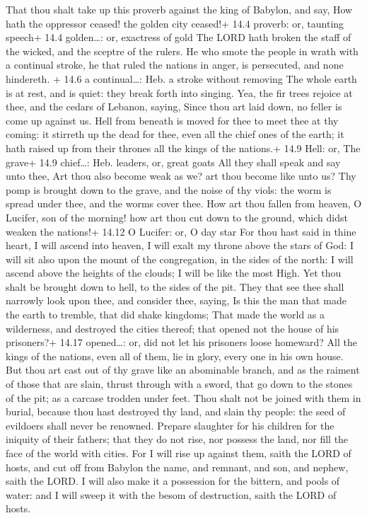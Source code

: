  That thou shalt take up this proverb against the king of
Babylon, and say, How hath the oppressor ceased! the golden city
ceased!+ 14.4 proverb: or, taunting speech+ 14.4 golden\ldots: or,
exactress of gold  The LORD hath broken the staff of the
wicked, and the sceptre of the rulers.  He who smote the
people in wrath with a continual stroke, he that ruled the nations in
anger, is persecuted, and none hindereth. + 14.6 a continual\ldots: Heb.
a stroke without removing  The whole earth is at rest, and
is quiet: they break forth into singing.  Yea, the fir trees
rejoice at thee, and the cedars of Lebanon, saying, Since thou art laid
down, no feller is come up against us.  Hell from beneath is
moved for thee to meet thee at thy coming: it stirreth up the dead for
thee, even all the chief ones of the earth; it hath raised up from their
thrones all the kings of the nations.+ 14.9 Hell: or, The grave+ 14.9
chief\ldots: Heb. leaders, or, great goats  All they shall
speak and say unto thee, Art thou also become weak as we? art thou
become like unto us?  Thy pomp is brought down to the
grave, and the noise of thy viols: the worm is spread under thee, and
the worms cover thee.  How art thou fallen from heaven, O
Lucifer, son of the morning! how art thou cut down to the ground, which
didst weaken the nations!+ 14.12 O Lucifer: or, O day star 
For thou hast said in thine heart, I will ascend into heaven, I will
exalt my throne above the stars of God: I will sit also upon the mount
of the congregation, in the sides of the north:  I will
ascend above the heights of the clouds; I will be like the most High.
 Yet thou shalt be brought down to hell, to the sides of
the pit.  They that see thee shall narrowly look upon thee,
and consider thee, saying, Is this the man that made the earth to
tremble, that did shake kingdoms;  That made the world as a
wilderness, and destroyed the cities thereof; that opened not the house
of his prisoners?+ 14.17 opened\ldots: or, did not let his prisoners
loose homeward?  All the kings of the nations, even all of
them, lie in glory, every one in his own house.  But thou
art cast out of thy grave like an abominable branch, and as the raiment
of those that are slain, thrust through with a sword, that go down to
the stones of the pit; as a carcase trodden under feet. 
Thou shalt not be joined with them in burial, because thou hast
destroyed thy land, and slain thy people: the seed of evildoers shall
never be renowned.  Prepare slaughter for his children for
the iniquity of their fathers; that they do not rise, nor possess the
land, nor fill the face of the world with cities.  For I
will rise up against them, saith the LORD of hosts, and cut off from
Babylon the name, and remnant, and son, and nephew, saith the LORD.
 I will also make it a possession for the bittern, and
pools of water: and I will sweep it with the besom of destruction, saith
the LORD of hosts.

